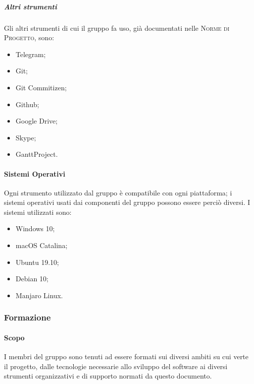 \documentclass[../norme-di-progetto.tex]{subfiles}
\begin{document}
\subparagraph{Altri strumenti}
Gli altri strumenti di cui il gruppo fa uso, già documentati nelle \textsc{Norme di Progetto}, sono:
\begin{itemize}
  \item Telegram;
  \item Git;
  \item Git Commitizen;
  \item Github;
  \item Google Drive;
  \item Skype;
  \item GanttProject.
\end{itemize}

\paragraph{Sistemi Operativi}
Ogni strumento utilizzato dal gruppo è compatibile con ogni piattaforma; i sistemi operativi usati dai componenti del gruppo possono essere perciò diversi. I sistemi utilizzati sono:
\begin{itemize}
  \item Windows 10;
  \item macOS Catalina;
  \item Ubuntu 19.10;
  \item Debian 10;
  \item Manjaro Linux.
\end{itemize}

\subsubsection{Formazione}
\paragraph{Scopo}
I membri del gruppo sono tenuti ad essere formati sui diversi ambiti su cui verte il progetto, dalle tecnologie necessarie allo sviluppo del software ai diversi strumenti organizzativi e di supporto normati da questo documento.
\end{document}
